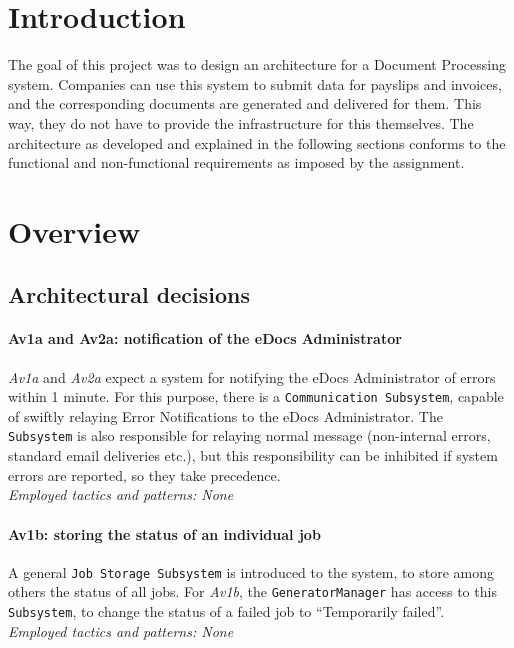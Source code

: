 \documentclass[a4paper,10pt]{article}
\begin{document}


\tableofcontents
\newpage

\section{Introduction}\label{sec:introduction}

The goal of this project was to design an architecture for a Document Processing system. Companies can use this system to submit data for payslips and invoices, and the corresponding documents are generated and delivered for them. This way, they do not have to provide the infrastructure for this themselves. The architecture as developed and explained in the following sections conforms to the functional and non-functional requirements as imposed by the assignment.

\section{Overview}\label{sec:overview}
\subsection{Architectural decisions}

\paragraph{Av1a and Av2a\@: notification of the eDocs Administrator}
\emph{Av1a} and \emph{Av2a} expect a system for notifying the eDocs Administrator of errors within 1 minute. For this purpose, there is a \texttt{Communication Subsystem}, capable of swiftly relaying Error Notifications to the eDocs Administrator. The \texttt{Subsystem} is also responsible for relaying normal message (non-internal errors, standard email deliveries etc.), but this responsibility can be inhibited if system errors are reported, so they take precedence.\\
\emph{Employed tactics and patterns: None}
    
\paragraph{Av1b\@: storing the status of an individual job}
A general \texttt{Job Storage Subsystem} is introduced to the system, to store among others the status of all jobs. For \emph{Av1b}, the \texttt{GeneratorManager} has access to this \texttt{Subsystem}, to change the status of a failed job to ``Temporarily failed''.\\
\emph{Employed tactics and patterns: None}
    
\end{document}
